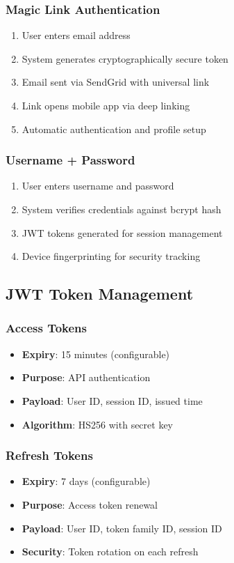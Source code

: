 \documentclass[12pt,a4paper]{article}
\begin{document}
\subsubsection{Magic Link Authentication}
\begin{enumerate}
    \item User enters email address
    \item System generates cryptographically secure token
    \item Email sent via SendGrid with universal link
    \item Link opens mobile app via deep linking
    \item Automatic authentication and profile setup
\end{enumerate}

\subsubsection{Username + Password}
\begin{enumerate}
    \item User enters username and password
    \item System verifies credentials against bcrypt hash
    \item JWT tokens generated for session management
    \item Device fingerprinting for security tracking
\end{enumerate}

\subsection{JWT Token Management}

\subsubsection{Access Tokens}
\begin{itemize}
    \item \textbf{Expiry}: 15 minutes (configurable)
    \item \textbf{Purpose}: API authentication
    \item \textbf{Payload}: User ID, session ID, issued time
    \item \textbf{Algorithm}: HS256 with secret key
\end{itemize}

\subsubsection{Refresh Tokens}
\begin{itemize}
    \item \textbf{Expiry}: 7 days (configurable)
    \item \textbf{Purpose}: Access token renewal
    \item \textbf{Payload}: User ID, token family ID, session ID
    \item \textbf{Security}: Token rotation on each refresh
\end{itemize}
\end{document}
